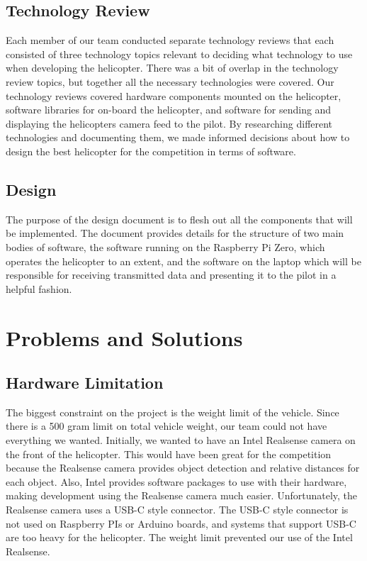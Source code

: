 \documentclass[onecolumn, oneside, letterpaper, draftclsnofoot, 10pt, compsoc]{IEEEtran}
\begin{document}
\subsection{Technology Review}
\noindent
Each member of our team conducted separate technology reviews that each consisted of three technology topics relevant to deciding what technology to use when developing the helicopter. There was a bit of overlap in the technology review topics, but together all the necessary technologies were covered. Our technology reviews covered hardware components mounted on the helicopter, software libraries for on-board the helicopter, and software for sending and displaying the helicopters camera feed to the pilot. By researching different technologies and documenting them, we made informed decisions about how to design the best helicopter for the competition in terms of software.
\subsection{Design}
The purpose of the design document is to flesh out all the components that will be implemented. The document provides details for the structure of two main bodies of software, the software running on the Raspberry Pi Zero, which operates the helicopter to an extent, and the software on the laptop which will be responsible for receiving transmitted data and presenting it to the pilot in a helpful fashion.
\noindent


\section{Problems and Solutions}
\subsection{Hardware Limitation}
The biggest constraint on the project is the weight limit of the vehicle. Since there is a 500 gram limit on total vehicle weight, our team could not have everything we wanted. Initially, we wanted to have an Intel Realsense camera on the front of the helicopter. This would have been great for the competition because the Realsense camera provides object detection and relative distances for each object. Also, Intel provides software packages to use with their hardware, making development using the Realsense camera much easier. Unfortunately, the Realsense camera uses a USB-C style connector. The USB-C style connector is not used on Raspberry PIs or Arduino boards, and systems that support USB-C are too heavy for the helicopter. The weight limit prevented our use of the Intel Realsense.
\end{document}
